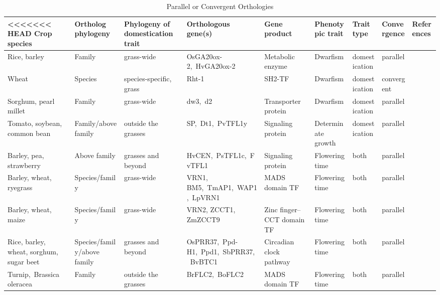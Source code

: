 \documentclass[12pt]{article}
\begin{document}
\begin{table}
\begin{center}
\caption{Parallel or Convergent Orthologies} \label{tab:Ortho}
        \fontsize{7}{8}\selectfont 
    \begin{tabular}{G{3.5cm}G{2.5cm}C{3.10cm}C{3.5cm}C{1.95cm}G{2.0cm}G{1.8cm}G{1.5cm}G{1.5cm}}
\\\toprule  
<<<<<<< HEAD
{\bf Crop species} & {\bf Ortholog phylogeny} & {\bf Phylogeny of domestication trait} & {\bf Orthologous gene(s)} & {\bf Gene product} & {\bf Phenotypic trait} & {\bf Trait type} & {\bf Convergence} & {\bf References} \\\toprule
Rice, barley & Family & grass-wide & OsGA20ox-2, HvGA20ox-2 & Metabolic enzyme & Dwarfism & domestication & parallel & \citep{Asano2007, Asano2011, Jia2009}\\
Wheat & Species & species-specific, grass & Rht-1 & SH2-TF & Dwarfism & domestication & convergent & \citep{Doebley2006}\\
Sorghum, pearl millet & Family & grass-wide & dw3, d2 & Transporter protein & Dwarfism & domestication & parallel & \citep{Multani2003,Parvathaneni2013}\\
Tomato, soybean, common bean & Family/above family & outside the grasses & SP, Dt1, PvTFL1y & Signaling protein & Determinate growth & domestication & parallel & \citep{Doebley2006, Repinski2012, Liu2010, Kwak2012, Tian2010}\\
Barley, pea, strawberry & Above family & grasses and beyond & HvCEN, PsTFL1c, FvTFL1 & Signaling protein & Flowering time & both & parallel & \citep{Comadran2012, Foucher2003, Koskela2012}\\
Barley, wheat, ryegrass & Species/family & grass-wide & VRN1, BM5, TmAP1, WAP1, LpVRN1 & MADS domain TF & Flowering time & both & parallel & \citep{Asp2011}\\
Barley, wheat, maize & Species/family & grass-wide & VRN2, ZCCT1, ZmZCCT9 & Zinc finger–CCT domain TF & Flowering time & both & parallel & \citep{Huang2017}\\
Rice, barley, wheat, sorghum, sugar beet & Species/family/above family & grasses and beyond & OsPRR37, Ppd-H1, Ppd1, SbPRR37, BvBTC1 & Circadian clock pathway & Flowering time & both & parallel & \citep{MURAKAMI2005, Turner2005, Jones2008, Beales2007, Wilhelm2008, Daz2012}\\
Turnip, Brassica oleracea & Family & outside the grasses & BrFLC2, BoFLC2 & MADS domain TF & Flowering time & both & parallel & \citep{Wu2012, Yuan2009, Okazaki2006}\\

\end{tabular}
\end{center}
\end{table}
\end{document}
